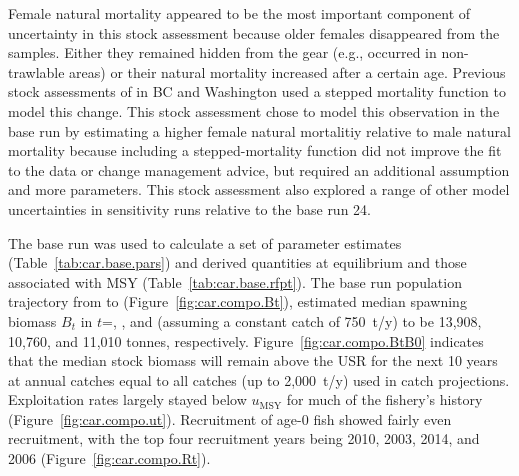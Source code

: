 \documentclass[11pt]{book}
\newcommand{\Bmsy}{B_\text{MSY}}
\newcommand{\umsy}{u_\text{MSY}}
\begin{document}
Female natural mortality appeared to be the most important component of uncertainty in this stock assessment because older females disappeared from the samples.
Either they remained hidden from the gear (e.g., occurred in non-trawlable areas) or their natural mortality increased after a certain age.
Previous stock assessments of \SPC{} in BC and Washington used a stepped mortality function to model this change. 
This stock assessment chose to model this observation in the base run by estimating a higher female natural mortalitiy relative to male natural mortality because including a stepped-mortality function did not improve the fit to the data or change management advice, but required an additional assumption and more parameters.
This stock assessment also explored a range of other model uncertainties in sensitivity runs relative to the base run 24.



The base run was used to calculate a set of parameter estimates (Table~\ref{tab:car.base.pars}) and derived quantities at equilibrium and those associated with MSY (Table~\ref{tab:car.base.rfpt}).
The base run population trajectory from \startYear{} to \currYear{} (Figure~\ref{fig:car.compo.Bt}), estimated median spawning biomass $B_t$ in $t$=\startYear, \currYear, and \projYear{} (assuming a constant catch of 750~t/y) to be 13,908, 10,760, and 11,010 tonnes, respectively.
Figure~\ref{fig:car.compo.BtB0} indicates that the median stock biomass will remain above the USR for the next 10 years at annual catches equal to all catches (up to 2,000~t/y) used in catch projections.
Exploitation rates largely stayed below $\umsy$ for much of the fishery's history (Figure~\ref{fig:car.compo.ut}).
Recruitment of age-0 fish showed fairly even recruitment, with the top four recruitment years being
2010, 2003, 2014, and 2006 (Figure~\ref{fig:car.compo.Rt}).
\end{document}
